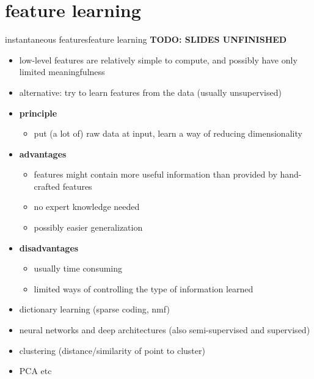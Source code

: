     \section[learned]{feature learning}
        \begin{frame}{instantaneous features}{feature learning}
            \textbf{TODO: SLIDES UNFINISHED}
            \begin{itemize}
                \item   low-level features are relatively simple to compute, and possibly have only limited meaningfulness
                \item   alternative: try to learn features from the data (usually unsupervised)
                \item   \textbf{principle}
                    \begin{itemize}
                        \item   put (a lot of) raw data at input, learn a way of reducing dimensionality
                    \end{itemize}
                \item   \textbf{advantages}
                    \begin{itemize}
                        \item   features might contain more useful information than provided by hand-crafted features
                        \item   no expert knowledge needed
                        \item   possibly easier generalization
                    \end{itemize}
                \item   \textbf{disadvantages}
                    \begin{itemize}
                        \item   usually time consuming
                        \item   limited ways of controlling the type of information learned
                    \end{itemize}
            \end{itemize}
            \bigskip
            \begin{itemize}
                \item   dictionary learning (sparse coding, nmf)
                \item   neural networks and deep architectures (also semi-supervised and supervised)
                \item   clustering (distance/similarity of point to cluster)
                \item   PCA etc
            \end{itemize}
        \end{frame}

